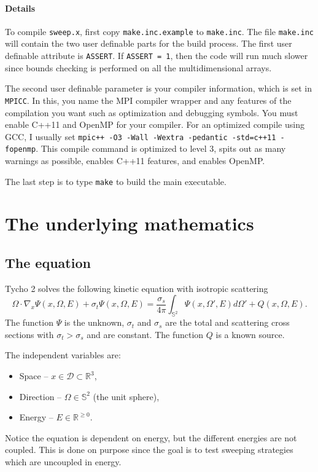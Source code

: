 \documentclass[12pt,letterpaper]{article}
\begin{document}
\paragraph{Details}
To compile {\tt sweep.x}, first copy {\tt make.inc.example} to {\tt make.inc}.
The file {\tt make.inc} will contain the two user definable parts for the build process.
The first user definable attribute is {\tt ASSERT}.
If {\tt ASSERT = 1}, then the code will run much slower since bounds checking is performed on all the multidimensional arrays.

The second user definable parameter is your compiler information, which is set in {\tt MPICC}.
In this, you name the MPI compiler wrapper and any features of the compilation you want such as optimization and debugging symbols.
You must enable C++11 and OpenMP for your compiler.
For an optimized compile using GCC, I usually set {\tt mpic++ -O3 -Wall -Wextra -pedantic -std=c++11 -fopenmp}.
This compile command is optimized to level 3, spits out as many warnings as possible, enables C++11 features, and enables OpenMP.

The last step is to type {\tt make} to build the main executable.













\section{The underlying mathematics}
\subsection{The equation}
Tycho 2 solves the following kinetic equation with isotropic scattering
\begin{equation} \label{eq:main}
\Omega \cdot \nabla_x \Psi(x,\Omega,E) + \sigma_t \Psi(x,\Omega,E) = \frac{\sigma_s}{4\pi} \int_{\mathbb{S}^2} \Psi(x,\Omega',E) d\Omega' + Q(x,\Omega,E).
\end{equation}
The function $\Psi$ is the unknown, $\sigma_t$ and $\sigma_s$ are the total and scattering cross sections with $\sigma_t > \sigma_s$ and are constant.
The function $Q$ is a known source.

The independent variables are:
\begin{itemize}
\item Space -- $x \in \mathcal{D} \subset \mathbb{R}^3$,
\item Direction -- $\Omega \in \mathbb{S}^2$ (the unit sphere), 
\item Energy -- $E \in \mathbb{R}^{\geq 0}$.
\end{itemize}
Notice the equation is dependent on energy, but the different energies are not coupled.
This is done on purpose since the goal is to test sweeping strategies which are uncoupled in energy.
\end{document}
